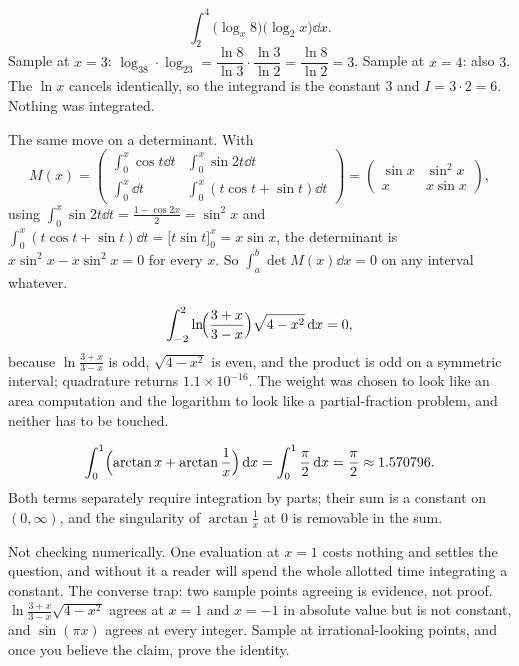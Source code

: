 \begin{worked}
\[\int_2^{4}\bigl(\log_x8\bigr)\bigl(\log_2x\bigr)\dd x.\]
Sample at $x=3$: $\log_38\cdot\log_23=\dfrac{\ln8}{\ln3}\cdot\dfrac{\ln3}{\ln2}=\dfrac{\ln8}{\ln2}=3$. Sample at $x=4$: also $3$. The $\ln x$ cancels identically, so the integrand is the constant $3$ and $I=3\cdot2=6$. Nothing was integrated.

The same move on a determinant. With
\[M(x)=\begin{pmatrix}\int_0^{x}\cos t\dd t & \int_0^{x}\sin2t\dd t\\[3pt] \int_0^{x}\dd t & \int_0^{x}(t\cos t+\sin t)\dd t\end{pmatrix}=\begin{pmatrix}\sin x & \sin^{2}x\\ x & x\sin x\end{pmatrix},\]
using $\int_0^{x}\sin2t\dd t=\tfrac{1-\cos2x}{2}=\sin^{2}x$ and $\int_0^{x}(t\cos t+\sin t)\dd t=\bigl[t\sin t\bigr]_0^{x}=x\sin x$, the determinant is $x\sin^{2}x-x\sin^{2}x=0$ for every $x$. So $\int_a^{b}\det M(x)\dd x=0$ on any interval whatever.
\end{worked}

\begin{worked}
\[\int_{-2}^{2}\ln\!\Bigl(\frac{3+x}{3-x}\Bigr)\sqrt{4-x^{2}}\,\mathrm{d} x=0,\]
because $\ln\tfrac{3+x}{3-x}$ is odd, $\sqrt{4-x^{2}}$ is even, and the product is odd on a symmetric interval; quadrature returns $1.1\times10^{-16}$. The weight was chosen to look like an area computation and the logarithm to look like a partial-fraction problem, and neither has to be touched.

\[\int_0^{1}\Bigl(\arctan x+\arctan\frac1x\Bigr)\,\mathrm{d} x=\int_0^{1}\frac{\pi}{2}\,\mathrm{d} x=\frac{\pi}{2}\approx1.570796.\]
Both terms separately require integration by parts; their sum is a constant on $(0,\infty)$, and the singularity of $\arctan\tfrac1x$ at $0$ is removable in the sum.
\end{worked}

\begin{trap}
Not checking numerically. One evaluation at $x=1$ costs nothing and settles the question, and without it a reader will spend the whole allotted time integrating a constant. The converse trap: two sample points agreeing is evidence, not proof. $\ln\tfrac{3+x}{3-x}\sqrt{4-x^{2}}$ agrees at $x=1$ and $x=-1$ in absolute value but is not constant, and $\sin(\pi x)$ agrees at every integer. Sample at irrational-looking points, and once you believe the claim, prove the identity.
\end{trap}

